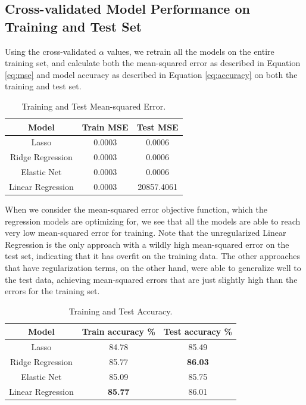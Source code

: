 \documentclass[letterpaper, 10 pt, conference]{ieeeconf}  %
\begin{document}
\subsection{Cross-validated Model Performance on Training and Test Set}
Using the cross-validated $\alpha$ values, we retrain all the models on the entire training set, and calculate both the mean-squared error as described in Equation \ref{eq:mse} and model accuracy as described in Equation \ref{eq:accuracy} on both the training and test set.

\begin{table}[ht]
\caption{Training and Test Mean-squared Error.} %
\centering %
\begin{tabular}{c c c} 
\hline\hline 
Model & Train MSE & Test MSE \\
\hline
Lasso & 0.0003 & 0.0006 \\
Ridge Regression & 0.0003 & 0.0006  \\
Elastic Net & 0.0003 & 0.0006 \\
Linear Regression & 0.0003 & 20857.4061 \\
\hline %
\end{tabular}
\label{table:traintest_mse_all} 
\end{table}

When we consider the mean-squared error objective function, which the regression models are optimizing for, we see that all the models are able to reach very low  mean-squared error for training. Note that the unregularized Linear Regression is the only approach with a wildly high mean-squared error on the test set, indicating that it has overfit on the training data. The other approaches that have regularization terms, on the other hand, were able to generalize well to the test data, achieving mean-squared errors that are just slightly high than the errors for the training set. 

\begin{table}[ht]
\caption{Training and Test Accuracy.} %
\centering %
\begin{tabular}{c c c} 
\hline\hline 
Model & Train accuracy \% & Test accuracy \% \\
\hline
Lasso & 84.78 & 85.49 \\
Ridge Regression & 85.77 & \textbf{86.03} \\
Elastic Net & 85.09 & 85.75 \\
Linear Regression & \textbf{85.77} & 86.01 \\
\hline %
\end{tabular}
\label{table:traintest_all} %
\end{table}
\end{document}
